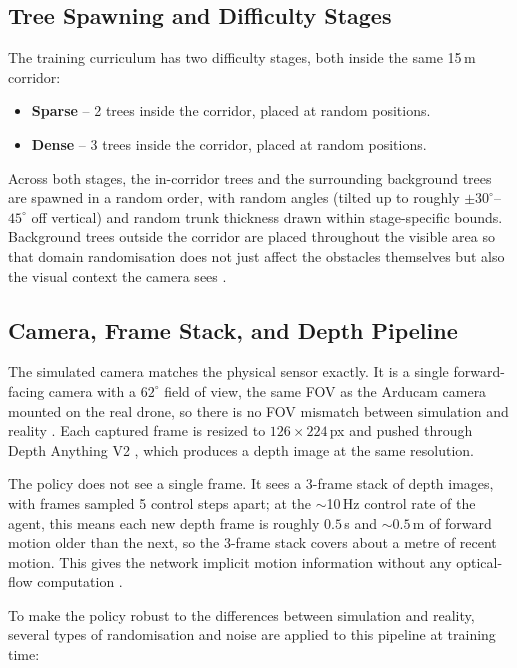 \documentclass[../main.tex]{subfiles}
\begin{document}
\subsection{Tree Spawning and Difficulty Stages}

The training curriculum has two difficulty stages, both inside the same 15\,m corridor:

\begin{itemize}
  \item \textbf{Sparse} -- 2 trees inside the corridor, placed at random positions.
  \item \textbf{Dense} -- 3 trees inside the corridor, placed at random positions.
\end{itemize}

Across both stages, the in-corridor trees and the surrounding background trees are spawned in a random order, with random angles (tilted up to roughly $\pm 30^{\circ}$--$45^{\circ}$ off vertical) and random trunk thickness drawn within stage-specific bounds. Background trees outside the corridor are placed throughout the visible area so that domain randomisation does not just affect the obstacles themselves but also the visual context the camera sees \cite{Loquercio2019}.


\subsection{Camera, Frame Stack, and Depth Pipeline}

The simulated camera matches the physical sensor exactly. It is a single forward-facing camera with a $62^{\circ}$ field of view, the same FOV as the Arducam camera mounted on the real drone, so there is no FOV mismatch between simulation and reality \cite{Loquercio2019,Zhao2020}. Each captured frame is resized to $126 \times 224$\,px and pushed through Depth Anything V2 \cite{Yang2024DepthAnythingV2}, which produces a depth image at the same resolution.

The policy does not see a single frame. It sees a 3-frame stack of depth images, with frames sampled 5 control steps apart; at the $\sim$10\,Hz control rate of the agent, this means each new depth frame is roughly $0.5$\,s and $\sim 0.5$\,m of forward motion older than the next, so the 3-frame stack covers about a metre of recent motion. This gives the network implicit motion information without any optical-flow computation \cite{Kabas2022}.


To make the policy robust to the differences between simulation and reality, several types of randomisation and noise are applied to this pipeline at training time:
\end{document}
